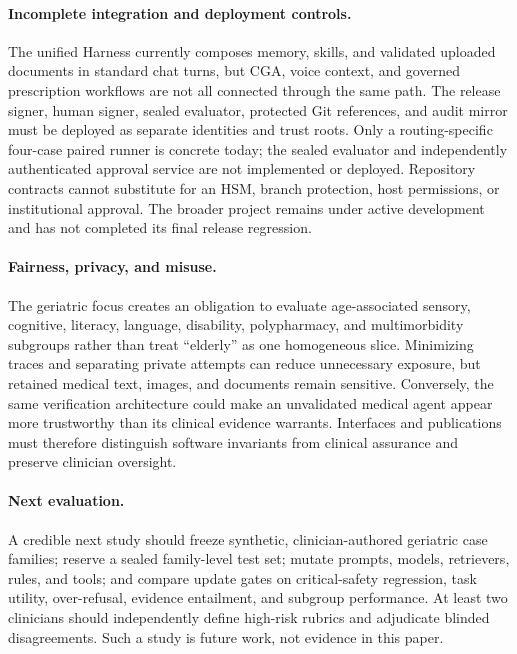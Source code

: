 \paragraph{Incomplete integration and deployment controls.}
The unified Harness currently composes memory, skills, and validated uploaded
documents in standard chat turns, but CGA, voice context, and governed
prescription workflows are not all connected through the same path.  The
release signer, human signer, sealed evaluator, protected Git references, and
audit mirror must be deployed as separate identities and trust roots.  Only a
routing-specific four-case paired runner is concrete today; the sealed
evaluator and independently authenticated approval service are not implemented
or deployed.  Repository contracts cannot substitute for an HSM, branch
protection, host permissions, or institutional approval.  The broader project
remains under active development and has not completed its final release
regression.

\paragraph{Fairness, privacy, and misuse.}
The geriatric focus creates an obligation to evaluate age-associated sensory,
cognitive, literacy, language, disability, polypharmacy, and multimorbidity
subgroups rather than treat ``elderly'' as one homogeneous slice.
Minimizing traces and separating private attempts can reduce unnecessary
exposure, but retained medical text, images, and documents remain sensitive.
Conversely, the same verification architecture could make an unvalidated
medical agent appear more trustworthy than its clinical evidence warrants.
Interfaces and publications must therefore distinguish software invariants
from clinical assurance and preserve clinician oversight.

\paragraph{Next evaluation.}
A credible next study should freeze synthetic, clinician-authored geriatric
case families; reserve a sealed family-level test set; mutate prompts, models,
retrievers, rules, and tools; and compare update gates on critical-safety
regression, task utility, over-refusal, evidence entailment, and subgroup
performance.  At least two clinicians should independently define high-risk
rubrics and adjudicate blinded disagreements.  Such a study is future work,
not evidence in this paper.
